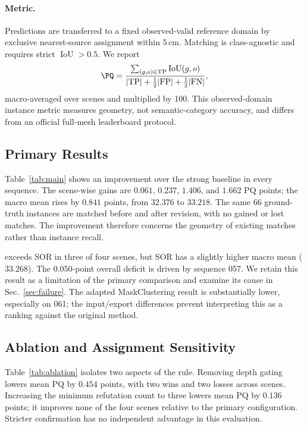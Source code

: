 \paragraph{Metric.} Predictions are transferred to a fixed observed-valid reference domain by exclusive nearest-source assignment within $5\,\mathrm{cm}$. Matching is class-agnostic and requires strict $\operatorname{IoU}>0.5$. We report
\begin{equation}
\PQ=\frac{\sum_{(g,o)\in\mathrm{TP}}\operatorname{IoU}(g,o)}{|\mathrm{TP}|+\tfrac12|\mathrm{FP}|+\tfrac12|\mathrm{FN}|},
\label{eq:pq}
\end{equation}
macro-averaged over scenes and multiplied by 100. This observed-domain instance metric measures geometry, not semantic-category accuracy, and differs from an official full-mesh leaderboard protocol.



\subsection{Primary Results}
Table~\ref{tab:main} shows an improvement over the strong baseline in every sequence. The scene-wise gains are $0.061$, $0.237$, $1.406$, and $1.662$ PQ points; the macro mean rises by $0.841$ points, from $32.376$ to $33.218$. The same 66 ground-truth instances are matched before and after revision, with no gained or lost matches. The improvement therefore concerns the geometry of existing matches rather than instance recall.

\ours{} exceeds SOR in three of four scenes, but SOR has a slightly higher macro mean ($33.268$). The $0.050$-point overall deficit is driven by sequence 057. We retain this result as a limitation of the primary comparison and examine its cause in Sec.~\ref{sec:failure}. The adapted MaskClustering result is substantially lower, especially on 061; the input/export differences prevent interpreting this as a ranking against the original method.

\begin{table}[t]
\centering
\caption{Paired contrasts on the four test scenes. Differences are in PQ points. Locked assignment is a secondary diagnostic, not a replacement for the primary metric.}
\label{tab:ablation}

\end{table}

\subsection{Ablation and Assignment Sensitivity}
Table~\ref{tab:ablation} isolates two aspects of the rule. Removing depth gating lowers mean PQ by $0.454$ points, with two wins and two losses across scenes. Increasing the minimum refutation count to three lowers mean PQ by $0.136$ points; it improves none of the four scenes relative to the primary configuration. Stricter confirmation has no independent advantage in this evaluation.

